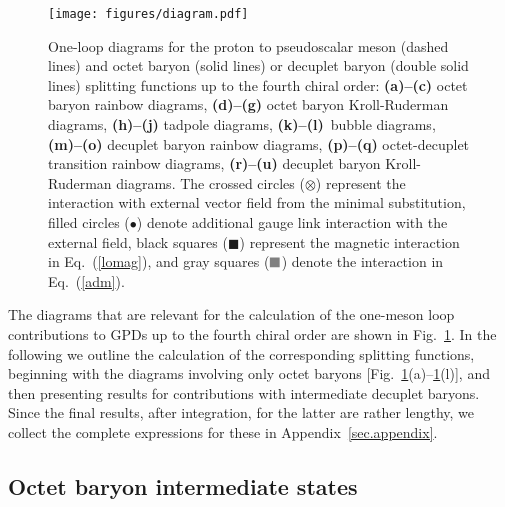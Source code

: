 \documentclass[preprintnumbers,prd,superscriptaddress,preprint]{revtex4-1}
\begin{document}
\begin{figure}[tp]
\begin{center}
\texttt{[image: figures/diagram.pdf]}
\caption{One-loop diagrams for the proton to pseudoscalar meson (dashed lines) and octet baryon (solid lines) or decuplet baryon (double solid lines) splitting functions up to the fourth chiral order:
{\bf (a)--(c)} octet baryon rainbow diagrams,
{\bf (d)--(g)} octet baryon Kroll-Ruderman diagrams,
{\bf (h)--(j)} tadpole diagrams,
\mbox{{\bf (k)--(l)} bubble} diagrams,
{\bf (m)--(o)} decuplet baryon rainbow diagrams,
{\bf (p)--(q)} octet-decuplet transition rainbow diagrams,
{\bf (r)--(u)} decuplet baryon Kroll-Ruderman diagrams.
The crossed circles ($\otimes$) represent the interaction with external vector field from the minimal substitution, 
filled circles ({\Large$\bullet$}) denote additional gauge link interaction with the external field,
black squares ($\blacksquare$) represent the magnetic interaction in Eq.~(\ref{lomag}), and
gray squares (${\textcolor{gray}{\blacksquare}}$) denote the interaction in Eq.~(\ref{adm}).} 
\label{diagrams}
\end{center}
\end{figure}


The diagrams that are relevant for the calculation of the one-meson loop contributions to GPDs up to the fourth chiral order are shown in Fig.~\ref{diagrams}.
In the following we outline the calculation of the corresponding splitting functions, beginning with the diagrams involving only octet baryons [Fig.~\ref{diagrams}(a)--\ref{diagrams}(l)], and then presenting results for contributions with intermediate decuplet baryons.
Since the final results, after integration, for the latter are rather lengthy, we collect the complete expressions for these in Appendix~\ref{sec.appendix}.


\clearpage
\subsection{Octet baryon intermediate states}
\label{ssec.fy_octet}
\end{document}
